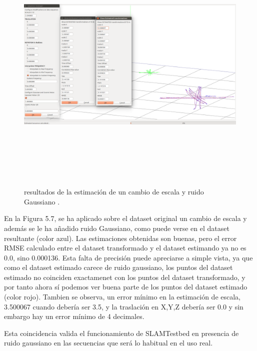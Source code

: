 \begin{figure}[h]
\begin{center}
\label{fig:opciones de View}\includegraphics[height=12.0cm,width=18.0cm]{img/cap6/Escala_GaussNoise_abba.png}
\hspace{0.5cm}

\end{center}

\caption{resultados de la estimación de un cambio de escala y ruido Gaussiano .}
\end{figure}

En la Figura 5.7, se ha aplicado sobre el dataset original un cambio de escala y además se le ha añadido ruido Gaussiano, como puede verse en el dataset resultante (color azul). Las estimaciones obtenidas son buenas, pero el error RMSE calculado entre el dataset transformado y el dataset estimando ya no es 0.0, sino 0.000136. Esta falta de precisión puede apreciarse a simple vista, ya que como el dataset estimado carece de ruido gaussiano, los puntos del dataset estimado no coinciden exactamenet con los puntos del dataset transformado, y por tanto ahora sí podemos ver buena parte de los puntos del dataset estimado (color rojo).
Tambien se observa, un error mínimo en la estimación de escala, 3.500067 cuando debería ser 3.5, y la traslación en X,Y,Z debería ser 0.0 y sin embargo hay un error mínimo de 4 decimales.

Esta coincidencia valida el funcionamiento de SLAMTestbed en presencia de ruido gaussiano en las secuencias que será lo habitual en el uso real.

